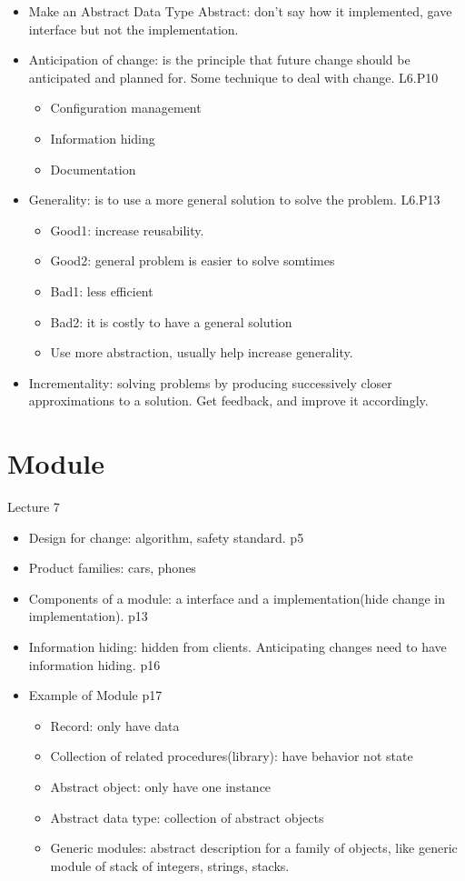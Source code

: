 \documentclass[12pt]{article}
\begin{document}
\begin{itemize}
    \item Make an Abstract Data Type Abstract: don’t say how it implemented, gave interface but not the implementation.
    \item Anticipation of change: is the principle that future change should be anticipated and planned for.
    Some technique to deal with change. L6.P10
    \begin{itemize}
        \item Configuration management
        \item Information hiding
        \item Documentation
    \end{itemize}
    \item Generality: is to use a more general solution to solve the problem. L6.P13
    \begin{itemize}
        \item Good1: increase reusability.
        \item Good2: general problem is easier to solve somtimes
        \item Bad1: less efficient
        \item Bad2: it is costly to have a general solution
        \item Use more abstraction, usually help increase generality.
    \end{itemize}
    \item Incrementality: solving problems by producing successively closer approximations to a solution. Get feedback, 
    and improve it accordingly.
\end{itemize}

\section{Module}
Lecture 7
\begin{itemize}
    \item Design for change: algorithm, safety standard. p5
    \item Product families: cars, phones
    \item Components of a module: a interface and a implementation(hide change in implementation). p13
    \item Information hiding: hidden from clients. Anticipating changes need to have information hiding. p16
    \item Example of Module p17
    \begin{itemize}
        \item Record: only have data
        \item Collection of related procedures(library): have behavior not state
        \item Abstract object: only have one instance
        \item Abstract data type: collection of abstract objects
        \item Generic modules: abstract description for a family of objects, like generic module of stack of integers, 
        strings, stacks.
    \end{itemize}
\end{itemize}
\end{document}
